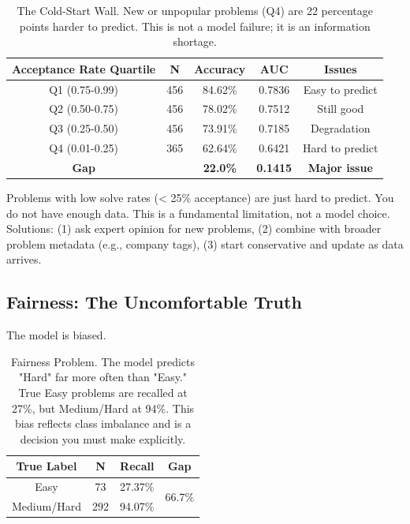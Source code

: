 \documentclass[conference]{IEEEtran}
\begin{document}
\begin{table}[h]
\centering
\small
\begin{tabular}{c|c|c|c|c}
\toprule
\textbf{Acceptance Rate Quartile} & \textbf{N} & \textbf{Accuracy} & \textbf{AUC} & \textbf{Issues} \\
\midrule
Q1 (0.75-0.99) & 456 & 84.62\% & 0.7836 & Easy to predict \\
Q2 (0.50-0.75) & 456 & 78.02\% & 0.7512 & Still good \\
Q3 (0.25-0.50) & 456 & 73.91\% & 0.7185 & Degradation \\
Q4 (0.01-0.25) & 365 & 62.64\% & 0.6421 & Hard to predict \\
\midrule
\textbf{Gap} & & \textbf{22.0\%} & \textbf{0.1415} & \textbf{Major issue} \\
\bottomrule
\end{tabular}
\caption{The Cold-Start Wall. New or unpopular problems (Q4) are 22 percentage points harder to predict. This is not a model failure; it is an information shortage.}
\label{tab:coldstart}
\end{table}

Problems with low solve rates (< 25\% acceptance) are just hard to predict. You do not have enough data. This is a fundamental limitation, not a model choice. Solutions: (1) ask expert opinion for new problems, (2) combine with broader problem metadata (e.g., company tags), (3) start conservative and update as data arrives.

\subsection{Fairness: The Uncomfortable Truth}

The model is biased.

\begin{table}[h]
\centering
\small
\begin{tabular}{c|c|c|c}
\toprule
\textbf{True Label} & \textbf{N} & \textbf{Recall} & \textbf{Gap} \\
\midrule
Easy & 73 & 27.37\% & \multirow{2}{*}{66.7\%} \\
Medium/Hard & 292 & 94.07\% & \\
\bottomrule
\end{tabular}
\caption{Fairness Problem. The model predicts "Hard" far more often than "Easy." True Easy problems are recalled at 27\%, but Medium/Hard at 94\%. This bias reflects class imbalance and is a decision you must make explicitly.}
\label{tab:fairness}
\end{table}
\end{document}
